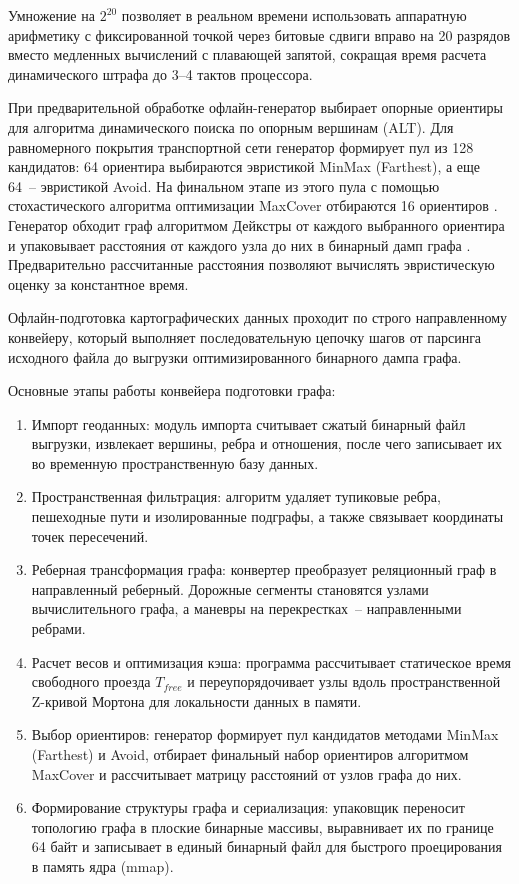 Умножение на $2^{20}$ позволяет в реальном времени использовать аппаратную арифметику с фиксированной точкой через битовые сдвиги вправо на 20 разрядов вместо медленных вычислений с плавающей запятой, сокращая время расчета динамического штрафа до 3–4 тактов процессора.

При предварительной обработке офлайн-генератор выбирает опорные ориентиры для алгоритма динамического поиска по опорным вершинам (ALT). Для равномерного покрытия транспортной сети генератор формирует пул из 128 кандидатов: 64 ориентира выбираются эвристикой MinMax (Farthest), а еще 64~-- эвристикой Avoid. На финальном этапе из этого пула с помощью стохастического алгоритма оптимизации MaxCover отбираются 16 ориентиров \cite{fuchs2010preprocessing}. Генератор обходит граф алгоритмом Дейкстры от каждого выбранного ориентира и упаковывает расстояния от каждого узла до них в бинарный дамп графа \cite{goldberg2004alt}. Предварительно рассчитанные расстояния позволяют вычислять эвристическую оценку за константное время.

Офлайн-подготовка картографических данных проходит по строго направленному конвейеру, который выполняет последовательную цепочку шагов от парсинга исходного файла до выгрузки оптимизированного бинарного дампа графа. 

Основные этапы работы конвейера подготовки графа:
\begin{enumerate}
    \item Импорт геоданных: модуль импорта считывает сжатый бинарный файл выгрузки, извлекает вершины, ребра и отношения, после чего записывает их во временную пространственную базу данных.
    \item Пространственная фильтрация: алгоритм удаляет тупиковые ребра, пешеходные пути и изолированные подграфы, а также связывает координаты точек пересечений.
    \item Реберная трансформация графа: конвертер преобразует реляционный граф в направленный реберный. Дорожные сегменты становятся узлами вычислительного графа, а маневры на перекрестках~-- направленными ребрами.
    \item Расчет весов и оптимизация кэша: программа рассчитывает статическое время свободного проезда $T_{free}$ и переупорядочивает узлы вдоль пространственной Z-кривой Мортона для локальности данных в памяти.
    \item Выбор ориентиров: генератор формирует пул кандидатов методами MinMax (Farthest) и Avoid, отбирает финальный набор ориентиров алгоритмом MaxCover и рассчитывает матрицу расстояний от узлов графа до них.
    \item Формирование структуры графа и сериализация: упаковщик переносит топологию графа в плоские бинарные массивы, выравнивает их по границе 64 байт и записывает в единый бинарный файл для быстрого проецирования в память ядра (mmap).
\end{enumerate}

